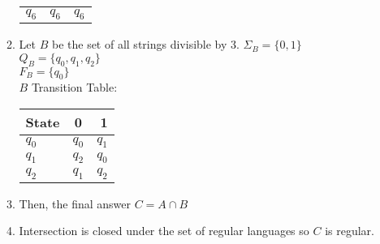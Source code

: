 \documentclass{article}
\begin{document}
\begin{enumerate}
\begin{enumerate}
\begin{tabular}{ l | c | r }
            $q_6$ & $q_6$ & $q_6$ \\
          \end{tabular}
        \item Let $B$ be the set of all strings divisible by 3.
          $\Sigma_B = \{0,1\}$\\
          $Q_B = \{q_0, q_1, q_2\}$\\
          $F_B = \{q_0\}$\\
          $B$ Transition Table:\\
          \begin{tabular}{ l | c | r }
            State & 0 & 1 \\ \hline
            $q_0$ & $q_0$ & $q_1$ \\

            $q_1$ & $q_2$ & $q_0$ \\

            $q_2$ & $q_1$ & $q_2$ \\
          \end{tabular}
        \item Then, the final answer $C = A \cap B$
        \item Intersection is closed under the set of regular languages so $C$ is regular.
      \end{enumerate}
  \end{enumerate}
\end{document}
